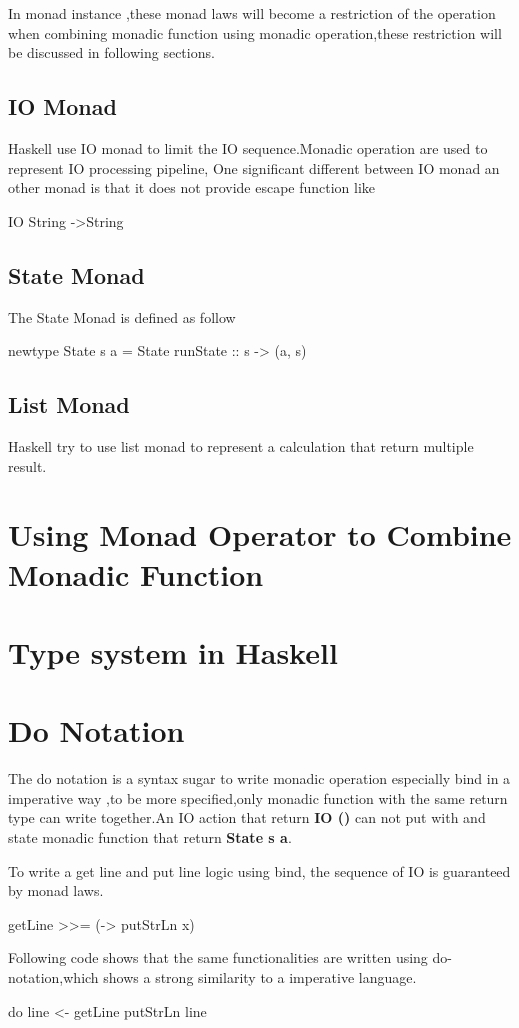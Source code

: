 In monad instance ,these monad laws will become a restriction of the operation when combining monadic function using monadic operation,these restriction will be discussed in following sections.


\subsection{IO Monad}
Haskell use IO monad to limit the IO sequence.Monadic operation are used to represent IO processing pipeline,
One significant different between IO monad an other monad is that it does not provide escape function like  
\begin{hcode}
IO String ->String
\end{hcode}

\subsection{State Monad}
The State Monad is defined as follow 
\begin{hcode}
newtype State s a = State {runState :: s -> (a, s)}
\end{hcode}



\subsection{List Monad}
Haskell try to use list monad to represent a calculation that return multiple result.


\section{Using Monad Operator to Combine Monadic Function}

\section{Type system in Haskell}
\section{Do Notation }
The do notation is a syntax sugar to write monadic operation especially bind in a imperative way ,to be more specified,only monadic function with the same return type can write together.An IO action that return \textbf{IO ()} can not put with and state monadic function that return \textbf{State s a}.

To write a get line and put line logic using bind, the sequence of IO is guaranteed by monad laws.
\begin{hcode}
 getLine >>= (\x -> putStrLn x)
\end{hcode}


Following code shows that the same functionalities are written using do-notation,which shows a strong similarity to a imperative language.
\begin{hcode}
do line <- getLine 
   putStrLn line
\end{hcode}


